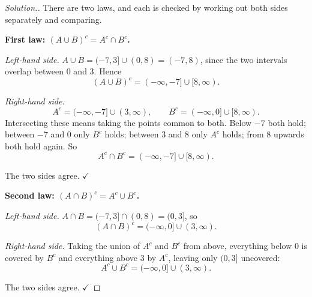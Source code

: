 \documentclass[11pt,a4paper]{article}
\theoremstyle{definition}
\newenvironment{solution}
  {\renewcommand{\qedsymbol}{}\begin{proof}[\textit{Solution}.]}
  {\end{proof}}
\let\amscheckmark\checkmark
\renewcommand{\checkmark}{\ensuremath{\amscheckmark}}
\begin{document}
\begin{solution}
There are two laws, and each is checked by working out both sides separately and
comparing.

\textbf{First law: $(A\cup B)^c=A^c\cap B^c$.}

\emph{Left-hand side.} $A\cup B=(-7,3]\cup(0,8)=(-7,8)$, since the two intervals
overlap between $0$ and $3$. Hence
$$(A\cup B)^c=(-\infty,-7]\cup[8,\infty).$$

\emph{Right-hand side.}
$$A^c=(-\infty,-7]\cup(3,\infty),\qquad B^c=(-\infty,0]\cup[8,\infty).$$
Intersecting these means taking the points common to both. Below $-7$ both hold; between
$-7$ and $0$ only $B^c$ holds; between $3$ and $8$ only $A^c$ holds; from $8$ upwards
both hold again. So
$$A^c\cap B^c=(-\infty,-7]\cup[8,\infty).$$

The two sides agree. $\checkmark$

\textbf{Second law: $(A\cap B)^c=A^c\cup B^c$.}

\emph{Left-hand side.} $A\cap B=(-7,3]\cap(0,8)=(0,3]$, so
$$(A\cap B)^c=(-\infty,0]\cup(3,\infty).$$

\emph{Right-hand side.} Taking the union of $A^c$ and $B^c$ from above, everything below
$0$ is covered by $B^c$ and everything above $3$ by $A^c$, leaving only $(0,3]$
uncovered:
$$A^c\cup B^c=(-\infty,0]\cup(3,\infty).$$

The two sides agree. $\checkmark$


\end{solution}
\end{document}
